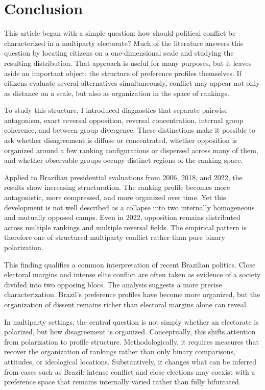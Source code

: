 \documentclass[12pt]{article}
\begin{document}
\section*{Conclusion}




This article began with a simple question: how should political conflict be
characterized in a multiparty electorate? Much of the literature answers this
question by locating citizens on a one-dimensional scale and studying the
resulting distribution. That approach is useful for many purposes, but it
leaves aside an important object: the structure of preference profiles
themselves. If citizens evaluate several alternatives simultaneously, conflict
may appear not only as distance on a scale, but also as organization in the
space of rankings.

To study this structure, I introduced diagnostics that separate pairwise
antagonism, exact reversal opposition, reversal concentration, internal group
coherence, and between-group divergence. These distinctions make it possible
to ask whether disagreement is diffuse or concentrated, whether opposition is
organized around a few ranking configurations or dispersed across many of them,
and whether observable groups occupy distinct regions of the ranking space.

Applied to Brazilian presidential evaluations from 2006, 2018, and 2022, the
results show increasing structuration. The ranking profile becomes more
antagonistic, more compressed, and more organized over time. Yet this
development is not well described as a collapse into two internally homogeneous
and mutually opposed camps. Even in 2022, opposition remains distributed across
multiple rankings and multiple reversal fields. The empirical pattern is
therefore one of structured multiparty conflict rather than pure binary
polarization.

This finding qualifies a common interpretation of recent Brazilian politics.
Close electoral margins and intense elite conflict are often taken as evidence
of a society divided into two opposing blocs. The analysis suggests a more
precise characterization. Brazil's preference profiles have become more
organized, but the organization of dissent remains richer than electoral
margins alone can reveal.

In multiparty settings, the central question is not simply whether an electorate
is polarized, but how disagreement is organized. Conceptually, this shifts
attention from polarization to profile structure. Methodologically, it requires
measures that recover the organization of rankings rather than only binary
comparisons, attitudes, or ideological locations. Substantively, it changes what
can be inferred from cases such as Brazil: intense conflict and close elections
may coexist with a preference space that remains internally varied rather than
fully bifurcated.
\end{document}
